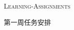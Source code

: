 \documentclass[landscape,a4paper]{article}
\begin{document}
\pagestyle{empty} %

\noindent


\begin{CJK}{UTF8}{gkai}
\begin{center}
\textsc{\LARGE Learning-Assignment\large s}\\ %
\begin{spacing}{1.5}
\end{spacing}
\textsc{\large 第一周任务安排} %
\end{center}
\end{CJK}
\end{document}
